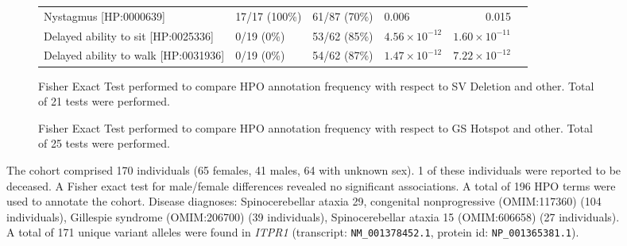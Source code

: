 \begin{figure}[htbp]
\begin{subfigure}[b]{0.95\textwidth}
{\begin{tabular}{llllrr}
Nystagmus [HP:0000639] & 17/17 (100\%) & 61/87 (70\%) & 0.006 & 0.015\\
Delayed ability to sit [HP:0025336] & 0/19 (0\%) & 53/62 (85\%) & $4.56\times 10^{-12}$ & $1.60\times 10^{-11}$\\
Delayed ability to walk [HP:0031936] & 0/19 (0\%) & 54/62 (87\%) & $1.47\times 10^{-12}$ & $7.22\times 10^{-12}$\\
\bottomrule
\end{tabular}
}
\captionsetup{justification=raggedright,singlelinecheck=false}
\caption{Fisher Exact Test performed to compare HPO annotation frequency with respect to SV Deletion and other. Total of
        21 tests were performed.}
\end{subfigure}
\vspace{0.2em}
\begin{subfigure}[b]{0.95\textwidth}
\centering
{}
\captionsetup{justification=raggedright,singlelinecheck=false}
\caption{Fisher Exact Test performed to compare HPO annotation frequency with respect to GS Hotspot and other. Total of
        25 tests were performed. }
\end{subfigure}

\vspace{0.2em}

\caption{The cohort comprised 170 individuals (65 females, 41 males, 64 with unknown sex). 1 of these individuals were reported to be deceased. 
A Fisher exact test for male/female differences revealed no significant associations.
A total of 196 HPO terms were used to annotate the cohort. Disease diagnoses: Spinocerebellar ataxia 29, congenital nonprogressive (OMIM:117360) (104 individuals), Gillespie syndrome (OMIM:206700) (39 individuals), Spinocerebellar ataxia 15 (OMIM:606658) (27 individuals). A total of 171 unique variant alleles were found in \textit{ITPR1} (transcript: \texttt{NM\_001378452.1}, protein id: \texttt{NP\_001365381.1}).}
\end{figure}
